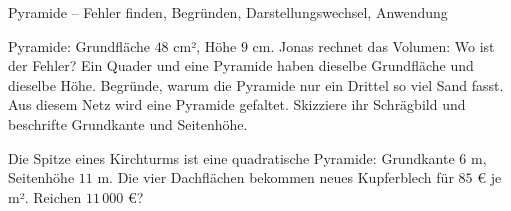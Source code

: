 \begin{aufgabe}{Pyramide – Fehler finden, Begründen, Darstellungswechsel, Anwendung}
\begin{teile}
\teil Pyramide: Grundfläche $48$ cm², Höhe $9$ cm. Jonas rechnet das Volumen:  Wo ist der Fehler?
\teil Ein Quader und eine Pyramide haben dieselbe Grundfläche und dieselbe Höhe. Begründe, warum die Pyramide nur ein Drittel so viel Sand fasst.
\teil Aus diesem Netz wird eine Pyramide gefaltet. Skizziere ihr Schrägbild und beschrifte Grundkante und Seitenhöhe.

\teil Die Spitze eines Kirchturms ist eine quadratische Pyramide: Grundkante $6$ m, Seitenhöhe $11$ m. Die vier Dachflächen bekommen neues Kupferblech für $85$ € je m². Reichen $11\,000$ €?
\end{teile}
\end{aufgabe}
